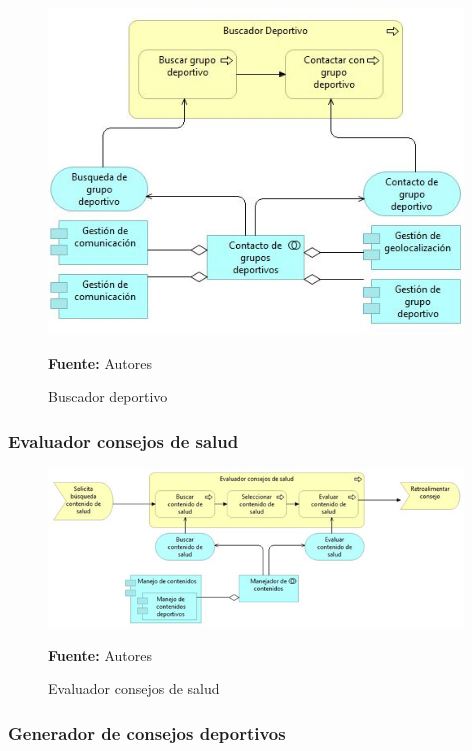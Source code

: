 \begin{figure}[!htb]
  \begin{center}
    \includegraphics[width=11cm]{./imagenes/application_usage/buscadordeportivo.png}
    \caption{Buscador deportivo}
    \label{fig:BP_BuscadorDeportivo}
    \textbf{Fuente:}  Autores
  \end{center}
\end{figure}

\subsubsection{Evaluador consejos de salud}

\begin{figure}[!htb]
  \begin{center}
    \includegraphics[width=11cm]{./imagenes/application_usage/evaluadorconsejossalud.png}
    \caption{Evaluador consejos de salud}
    \label{fig:BP_EvaluadorConsejosSalud}
    \textbf{Fuente:}  Autores
  \end{center}
\end{figure}

\subsubsection{Generador de consejos deportivos}

